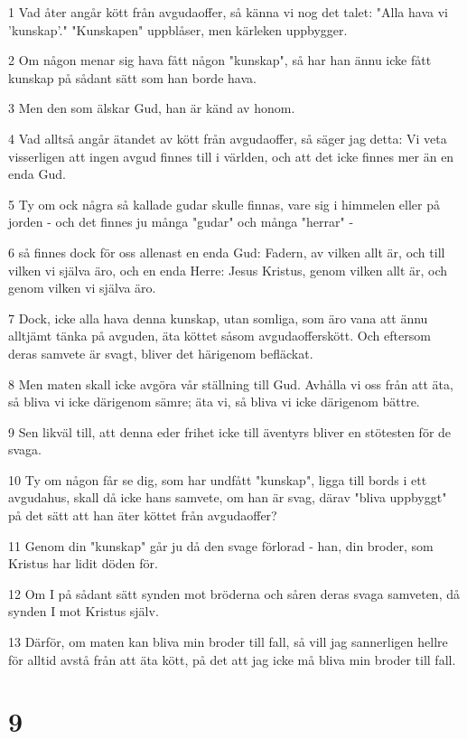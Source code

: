 \par 1 Vad åter angår kött från avgudaoffer, så känna vi nog det talet: "Alla hava vi 'kunskap'." "Kunskapen" uppblåser, men kärleken uppbygger.
\par 2 Om någon menar sig hava fått någon "kunskap", så har han ännu icke fått kunskap på sådant sätt som han borde hava.
\par 3 Men den som älskar Gud, han är känd av honom.
\par 4 Vad alltså angår ätandet av kött från avgudaoffer, så säger jag detta: Vi veta visserligen att ingen avgud finnes till i världen, och att det icke finnes mer än en enda Gud.
\par 5 Ty om ock några så kallade gudar skulle finnas, vare sig i himmelen eller på jorden - och det finnes ju många "gudar" och många "herrar" -
\par 6 så finnes dock för oss allenast en enda Gud: Fadern, av vilken allt är, och till vilken vi själva äro, och en enda Herre: Jesus Kristus, genom vilken allt är, och genom vilken vi själva äro.
\par 7 Dock, icke alla hava denna kunskap, utan somliga, som äro vana att ännu alltjämt tänka på avguden, äta köttet såsom avgudaofferskött. Och eftersom deras samvete är svagt, bliver det härigenom befläckat.
\par 8 Men maten skall icke avgöra vår ställning till Gud. Avhålla vi oss från att äta, så bliva vi icke därigenom sämre; äta vi, så bliva vi icke därigenom bättre.
\par 9 Sen likväl till, att denna eder frihet icke till äventyrs bliver en stötesten för de svaga.
\par 10 Ty om någon får se dig, som har undfått "kunskap", ligga till bords i ett avgudahus, skall då icke hans samvete, om han är svag, därav "bliva uppbyggt" på det sätt att han äter köttet från avgudaoffer?
\par 11 Genom din "kunskap" går ju då den svage förlorad - han, din broder, som Kristus har lidit döden för.
\par 12 Om I på sådant sätt synden mot bröderna och såren deras svaga samveten, då synden I mot Kristus själv.
\par 13 Därför, om maten kan bliva min broder till fall, så vill jag sannerligen hellre för alltid avstå från att äta kött, på det att jag icke må bliva min broder till fall.

\chapter{9}

